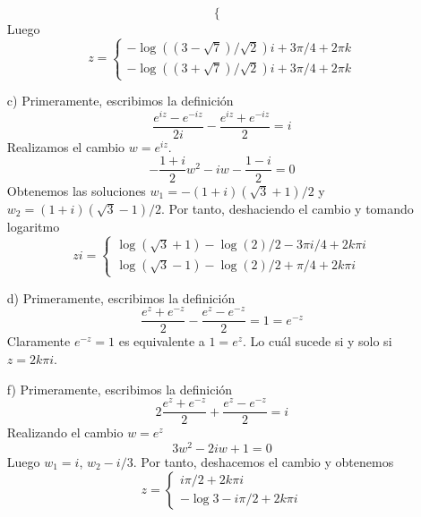 \documentclass[twoside]{article}
\begin{document}
\begin{solucion}
\begin{enumerate}[a)]
$$\begin{cases}
\end{cases}
$$
Luego 
$$
z = \begin{cases}
-\log((3-\sqrt{7})/\sqrt{2})i +3\pi/4 + 2\pi k\\
-\log((3+\sqrt{7})/\sqrt{2})i+3\pi/4 + 2\pi k
\end{cases}
$$
\item[c)] Primeramente, escribimos la definición
$$
\frac{e^{iz}-e^{-iz}}{2i}-\frac{e^{iz}+e^{-iz}}{2} = i
$$
Realizamos el cambio $w=e^{iz}$.
$$
-\frac{1+i}{2}w^2-iw -\frac{1-i}{2}= 0
$$
Obtenemos las soluciones $w_1 = -(1+i)(\sqrt{3}+1)/2$ y $w_2=(1+i)(\sqrt{3}-1)/2$. Por tanto, deshaciendo el cambio y tomando logaritmo
$$
zi = \begin{cases}
\log(\sqrt{3}+1)-\log(2)/2-3\pi i /4 + 2k\pi i\\
\log(\sqrt{3}-1)-\log(2)/2 + \pi/4 + 2k\pi i
\end{cases}
$$
\item[d)] Primeramente, escribimos la definición
$$
\frac{e^{z}+e^{-z}}{2}-\frac{e^{z}-e^{-z}}{2} = 1 = e^{-z}
$$
Claramente $e^{-z}=1$ es equivalente a $1 = e^{z}$. Lo cuál sucede si y solo si $z=2k\pi i$.

\item[f)] Primeramente, escribimos la definición
$$
2\frac{e^z+e^{-z}}{2}+\frac{e^z-e^{-z}}{2} = i
$$
Realizando el cambio $w=e^z$
$$
3w^2-2iw+1 = 0
$$
Luego $w_1=i$, $w_2-i/3$. Por tanto, deshacemos el cambio y obtenemos
$$
z = \begin{cases}
i \pi/2 + 2k\pi i\\
-\log 3 - i\pi/2 + 2k\pi i
\end{cases}
$$
\end{enumerate}
\end{solucion}
\newpage
\end{document}
